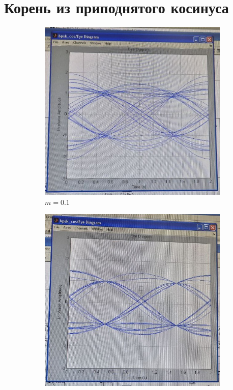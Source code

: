 \documentclass[14pt, a4paper]{article}
\begin{document}
\section{Корень из приподнятого косинуса}

\begin{figure}[H]
\centering
\begin{subfigure}{.33\textwidth}
  \centering
  \includegraphics[width=.95\linewidth]{../images/rt2-7d}
  \caption{$m=0.1$}
\end{subfigure}%
\begin{subfigure}{.33\textwidth}
  \centering
  \includegraphics[width=.95\linewidth]{../images/rt2-7e}

\end{subfigure}
\end{figure}
\end{document}
